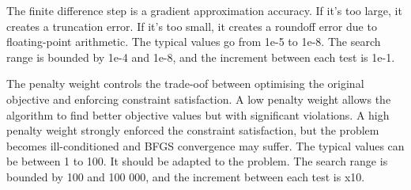The finite difference step is a gradient approximation accuracy. If it’s too large, it creates a truncation error. If it’s too small, it creates a roundoff error due to floating-point arithmetic. \cite[Section 7.1]{nocedalwright2006}
The typical values go from 1e-5 to 1e-8. The search range is bounded by 1e-4 and 1e-8, and the increment between each test is 1e-1.
\begin{table}[H]
    \centering
    \caption{Exploration of finite difference step}
    \label{tab:truss_exp_fd}
\end{table}

The penalty weight controls the trade-oof between optimising the original objective and enforcing constraint satisfaction. A low penalty weight allows the algorithm to find better objective values but with significant violations. A high penalty weight strongly enforced the constraint satisfaction, but the problem becomes ill-conditioned and BFGS convergence may suffer.
The typical values can be between 1 to 100. It should be adapted to the problem. The search range is bounded by 100 and 100 000, and the increment between each test is x10.
\begin{table}[H]
    \centering
    \caption{Exploration of penalty weights}
    \label{tab:truss_exp_penalty}
\end{table}

